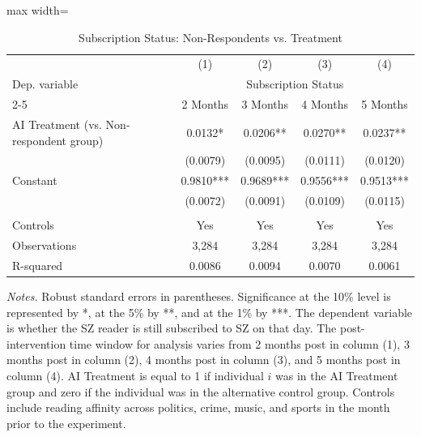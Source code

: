 \begin{table}[H]
 \centering
 \caption{Subscription Status: Non-Respondents vs. Treatment}
 \label{tab:PC_T_subscription}
 \begin{adjustbox}{max width=\textwidth}
\def\sym#1{\ifmmode^{#1}\else\(^{#1}\)\fi}
\begin{tabular}{l*{4}{c}}
 \toprule
 \midrule
 &\multicolumn{1}{c}{(1)} &\multicolumn{1}{c}{(2)} &\multicolumn{1}{c}{(3)} &\multicolumn{1}{c}{(4)}  \\
\multicolumn{1}{l}{Dep. variable} &\multicolumn{4}{c}{Subscription Status}  \\
\cmidrule(lr){2-5}
\multicolumn{1}{c}{Months Post-Intervention} &\multicolumn{1}{c}{2 Months} &\multicolumn{1}{c}{3 Months} &\multicolumn{1}{c}{4 Months} &\multicolumn{1}{c}{5 Months}  \\
 \midrule
\addlinespace
AI Treatment (vs. Non-respondent group)&   0.0132*  &   0.0206** &   0.0270** &   0.0237** \\
                & (0.0079)   & (0.0095)   & (0.0111)   & (0.0120)   \\
Constant        &   0.9810***&   0.9689***&   0.9556***&   0.9513***\\
                & (0.0072)   & (0.0091)   & (0.0109)   & (0.0115)   \\
\addlinespace
 & & & & \\
Controls & Yes & Yes & Yes & Yes \\
\midrule
Observations &    3,284 &    3,284 &    3,284 &    3,284 \\
R-squared &   0.0086 &   0.0094 &   0.0070 &   0.0061 \\
 \hline
 \bottomrule
\end{tabular}
 \end{adjustbox}
 \par
 \begin{minipage}{0.98\linewidth}
 \baselineskip9pt {\scriptsize \vspace{0.1cm} { \it Notes.} Robust standard errors in parentheses. Significance at the 10\% level is represented by *, at the 5\% by **, and at the 1\% by ***. The dependent variable is whether the SZ reader is still subscribed to SZ on that day. The post-intervention time window for analysis varies from 2 months post in column (1), 3 months post in column (2), 4 months post in column (3), and 5 months post in column (4). AI Treatment is equal to 1 if individual $i$ was in the AI Treatment group and zero if the individual was in the alternative control group. Controls include reading affinity across politics, crime, music, and sports in the month prior to the experiment.}
 \end{minipage}
 \end{table}

